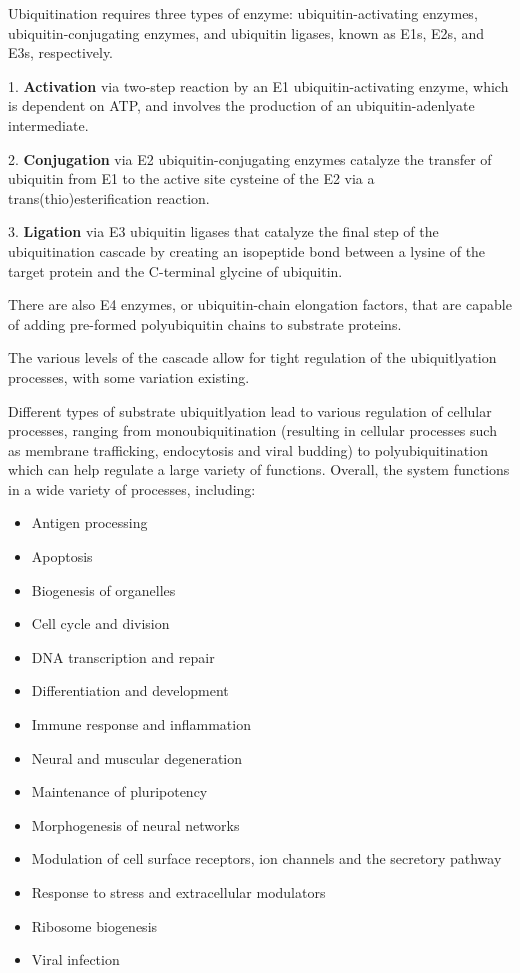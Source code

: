 \documentclass[plain,basic]{inVerba-notes}
\begin{document}
{\begin{enumerate}
{      Ubiquitination requires three types of enzyme: ubiquitin-activating enzymes, ubiquitin-conjugating enzymes, and ubiquitin ligases, known as E1s, E2s, and E3s, respectively. 

      1. \textbf{Activation} via two-step reaction by an E1 ubiquitin-activating enzyme, which is dependent on ATP, and involves the production of an ubiquitin-adenlyate intermediate. 

      2. \textbf{Conjugation} via E2 ubiquitin-conjugating enzymes catalyze the transfer of ubiquitin from E1 to the active site cysteine of the E2 via a trans(thio)esterification reaction. 

      3. \textbf{Ligation} via E3 ubiquitin ligases that catalyze the final step of the ubiquitination cascade by creating an isopeptide bond between a lysine of the target protein and the C-terminal glycine of ubiquitin. 
      
      There are also E4 enzymes, or ubiquitin-chain elongation factors, that are capable of adding pre-formed polyubiquitin chains to substrate proteins.

      The various levels of the cascade allow for tight regulation of the ubiquitlyation processes, with some variation existing. 

      Different types of substrate ubiquitlyation lead to various regulation of cellular processes, ranging from monoubiquitination (resulting in cellular processes such as membrane trafficking, endocytosis and viral budding) to polyubiquitination which can help regulate a large variety of functions. Overall, the system functions in a wide variety of processes, including: 
      
      \begin{multicols}{2}
      \begin{itemize}
        \item Antigen processing
        \item Apoptosis
        \item Biogenesis of organelles
        \item Cell cycle and division
        \item DNA transcription and repair
        \item Differentiation and development
        \item Immune response and inflammation
        \item Neural and muscular degeneration
        \item Maintenance of pluripotency
        \item Morphogenesis of neural networks
        \item Modulation of cell surface receptors, ion channels and the secretory pathway
        \item Response to stress and extracellular modulators
        \item Ribosome biogenesis
        \item Viral infection
      \end{itemize}
    \end{multicols}
    }


\end{enumerate}}
\end{document}
